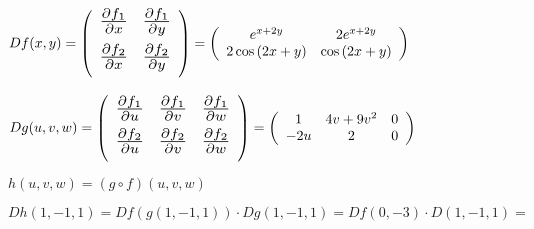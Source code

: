 \documentclass[10pt, titlepage]{article}
\newcommand{\bfrac}[2]{\scalebox{1.4}{$\frac{#1}{#2}$}}
\newcommand{\tindent}{\indent\indent\indent}
\begin{document}
\tindent$Df (x, y) = \left ( \begin{array}{cc}

\bfrac{\partial f_1}{\partial x} & \bfrac{\partial f_1}{\partial y} \vspace{2mm}\\
\bfrac{\partial f_2}{\partial x} & \bfrac{\partial f_2}{\partial y} \vspace{2mm}\\

\end{array} \right )
=
\left ( \begin{array}{cc}

e^{x + 2y} & 2e^{x + 2y}\\
2 \cos{(2x + y)} & \cos{(2x + y)}\\

\end{array} \right )
$
\vspace{3mm}

\tindent$Dg (u, v, w) = \left ( \begin{array}{ccc}

\bfrac{\partial f_1}{\partial u} & \bfrac{\partial f_1}{\partial v} & \bfrac{\partial f_1}{\partial w} 
\vspace{2mm}\\
\bfrac{\partial f_2}{\partial u} & \bfrac{\partial f_2}{\partial v} & \bfrac{\partial f_2}{\partial w} 
\vspace{2mm}\\

\end{array} \right )
=
\left ( \begin{array}{ccc}

1 & 4v + 9v^2 & 0\\
-2u & 2 & 0\\

\end{array} \right )
$
\vspace{5mm}

\tindent $h (u, v, w) = (g \circ f) (u, v, w)$
\vspace{3mm}

\tindent$Dh (1, -1, 1) = Df (g (1, -1, 1)) \cdot Dg (1, -1, 1) = Df (0, -3) \cdot D (1, -1, 1) =$
\vspace{3mm}
\end{document}
